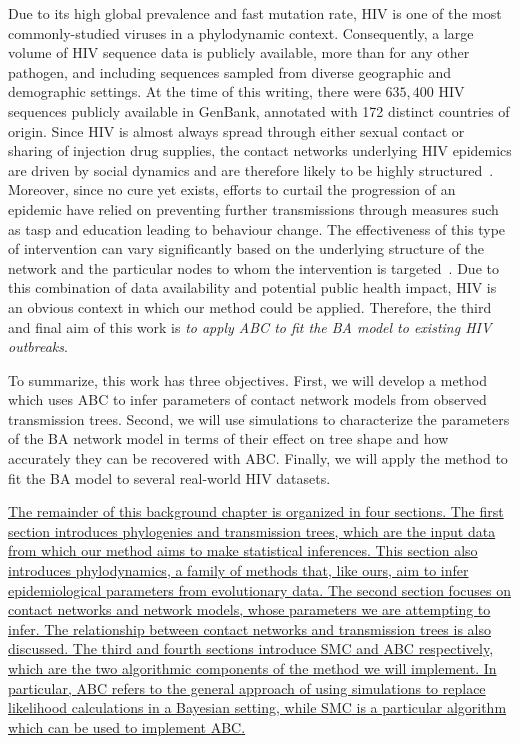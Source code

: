 Due to its high global prevalence and fast mutation rate, \gls{HIV} is one of
the most commonly-studied viruses in a phylodynamic context. Consequently, a
large volume of \gls{HIV} sequence data is publicly available, more than for
any other pathogen, and including sequences sampled from diverse geographic and
demographic settings. At the time of this writing, there were $635,400$ HIV
sequences publicly available in GenBank, annotated with 172 distinct countries
of origin. Since \gls{HIV} is almost always spread through either sexual
contact or sharing of injection drug supplies, the contact networks underlying
\gls{HIV} epidemics are driven by social dynamics and are therefore likely to
be highly structured~\autocite{clemenccon2015statistical}. Moreover, since no
cure yet exists, efforts to curtail the progression of an epidemic have relied
on preventing further transmissions through measures such as \gls{tasp} and
education leading to behaviour change. The effectiveness of this type of
intervention can vary significantly based on the underlying structure of the
network and the particular nodes to whom the intervention is
targeted~\autocite{little2014using,wang2015targeting}. Due to this combination
of data availability and potential public health impact, \gls{HIV} is an
obvious context in which our method could be applied. Therefore, the third and
final aim of this work is \emph{to apply \gls{ABC} to fit the \acrlong{BA}
model to existing \gls{HIV} outbreaks}.

To summarize, this work has three objectives. First, we will develop a method
which uses \gls{ABC} to infer parameters of contact network models from
observed transmission trees. Second, we will use simulations to characterize
the parameters of the \gls{BA} network model in terms of their effect on tree
shape and how accurately they can be recovered with \gls{ABC}. Finally, we will
apply the method to fit the \gls{BA} model to several real-world \gls{HIV}
datasets.

{\color{blue}\uline{
The remainder of this background chapter is organized in four sections. The
first section introduces phylogenies and transmission trees, which are the
input data from which our method aims to make statistical inferences. This
section also introduces phylodynamics, a family of methods that, like ours, aim
to infer epidemiological parameters from evolutionary data. The second section
focuses on contact networks and network models, whose parameters we are
attempting to infer. The relationship between contact networks and transmission
trees is also discussed. The third and fourth sections introduce \gls{SMC}
and \gls{ABC} respectively, which are the two algorithmic components of the
method we will implement. In particular, \gls{ABC} refers to the general
approach of using simulations to replace likelihood calculations in a Bayesian
setting, while \gls{SMC} is a particular algorithm which can be used to
implement \gls{ABC}. }}


